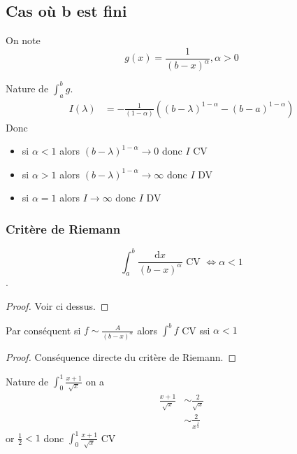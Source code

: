 \documentclass[11pt,colorlinks]{book}
\theoremstyle{mytheoremstyle}
\theoremstyle{mytheoremstyle}
\theoremstyle{mytheoremstyle}
\theoremstyle{mytheoremstyle}
\theoremstyle{mytheoremstyle}
\theoremstyle{mytheoremstyle}
\theoremstyle{mytheoremstyle}
\theoremstyle{mytheoremstyle}
\theoremstyle{myproblemstyle}
\renewcommand{\equiv}{\sim}
\begin{document}
  \subsection{Cas où b est fini}
  On note 
  \begin{equation*}
    g(x) = \frac{1}{(b-x)^{\alpha}}, \alpha > 0
  \end{equation*}
  \begin{prop}
    Nature de $\int_a^b g$. 
    \begin{align*}
      I(\lambda) &= - \frac{1}{(1-\alpha)} \left((b-\lambda)^{1-\alpha} - (b-a)^{1 - \alpha}\right)
    \end{align*}
    Donc
    \begin{itemize}
      \item si $\alpha < 1$ alors $(b - \lambda)^{1-\alpha} \to 0$ donc $I$ CV
      \item si $\alpha > 1$ alors $(b - \lambda)^{1-\alpha} \to \infty$ donc $I$ DV
      \item si $\alpha = 1$ alors $I \to \infty$ donc $I$ DV
    \end{itemize}
  \end{prop}
  \subsubsection{Critère de Riemann}
  \begin{theorem}
    \begin{equation*}
      \int_a^b \frac{\text{d}x}{(b-x)^{\alpha}} \text{ CV } \Leftrightarrow \alpha < 1
    \end{equation*}.
    \begin{proof}
      Voir ci dessus.
    \end{proof}
  \end{theorem}
  \begin{prop}
    Par conséquent si $f \equiv \frac{A}{(b-x)^{\alpha}}$ alors $\int^b f$ CV ssi $\alpha < 1$
    \begin{proof}
      Conséquence directe du critère de Riemann.
    \end{proof}
  \end{prop}
  \begin{ex}
    Nature de $\int_0^1 \frac{x+1}{\sqrt{x}}$ on a 
    \begin{align*}
      \frac{x+1}{\sqrt{x}} &\equiv \frac{2}{\sqrt{x}} \\
                          &\equiv \frac{2}{x^{\frac{1}{2}}}
    \end{align*}
    or $\frac{1}{2} < 1$ donc $\int_0^1 \frac{x+1}{\sqrt{x}}$ CV
  \end{ex}
\end{document}
